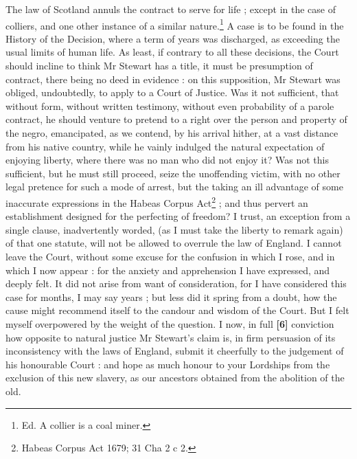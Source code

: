 \documentclass[a4paper]{article}
\begin{document}
The law of Scotland annuls the contract to serve for life ; except in the case of colliers, and one other instance of a similar nature.\footnote{Ed. A collier is a coal miner.} A case is to be found in the History of the Decision, where a term of years was discharged, as exceeding the usual limits of human life. As least, if contrary to all these decisions, the Court  should incline to think Mr Stewart has a title, it must be presumption of contract, there being no deed in evidence : on this supposition, Mr Stewart was obliged, undoubtedly, to apply to a Court of Justice. Was it not sufficient, that without form, without written testimony, without even probability of a parole contract, he should venture to pretend to a right over the person and property of the negro, emancipated, as we contend, by his arrival hither, at a vast distance from his native country, while he vainly indulged the natural expectation of enjoying liberty, where there was no man who did not enjoy it? Was not this sufficient, but he must still proceed, seize the unoffending victim, with no other legal pretence for such a mode of arrest, but the taking an ill advantage of some inaccurate expressions in the Habeas Corpus Act\footnote{Habeas Corpus Act 1679; 31 Cha 2 c 2.} ; and thus pervert an establishment designed for the perfecting of freedom? I trust, an exception from a single clause, inadvertently worded, (as I must take the liberty to remark again) of that one statute, will not be allowed to overrule the law of England. I cannot leave the Court, without some excuse for the confusion in which I rose, and in which I now appear : for the anxiety and apprehension I have expressed, and deeply felt. It did not arise from want of consideration, for I have considered this case for months, I may say years ; but less did it spring from a doubt, how the cause might recommend itself to the candour and wisdom of the Court. But I felt myself overpowered by the weight of the question. I now, in full \textbf{[6]} conviction how opposite to natural justice Mr Stewart's claim is, in firm persuasion of its inconsistency with the laws of England, submit it cheerfully to the judgement of his honourable Court : and hope as much honour to your Lordships from the exclusion of this new slavery, as our ancestors obtained from the abolition of the old.
\end{document}
